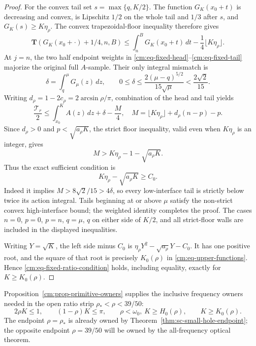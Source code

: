 \documentclass[11pt]{article}
\numberwithin{equation}{section}
\theoremstyle{definition}
\theoremstyle{remark}
\begin{document}
\begin{proof}
For the convex tail set \(s=\max\{q,K/2\}\).  The function
\(G_K(x_0+t)\) is decreasing and convex, is Lipschitz \(1/2\) on the
whole tail and \(1/3\) after \(s\), and
\(G_K(s)\geq K\eta_\rho\).  The convex trapezoidal-floor inequality
therefore gives
\begin{equation}
 \mathbf T(G_K(x_0+\cdot)+1/4,n,B)
 \leq\int_n^B G_K(x_0+t)\,dt
 -\frac14\lfloor K\eta_\rho\rfloor.
 \label{cm:eq-fixed-tail}
\end{equation}
At \(j=n\), the two half endpoint weights in
\eqref{cm:eq-fixed-head}--\eqref{cm:eq-fixed-tail} majorize the original
full \(A\)-sample.  Their only integral mismatch is
\[
 \delta=\int_q^\mu G_\mu(z)\,dz,
 \qquad 0\leq\delta\leq
 \frac{2(\mu-q)^{5/2}}{15\sqrt\mu}<\frac{2\sqrt2}{15}.
\]
Writing \(d_\rho=1-2c_\rho=2\arcsin\rho/\pi\), combination of the
head and tail yields
\[
 \frac{\mathcal T_r}{2}
 \leq\int_{x_0}^KA(z)\,dz+\delta-\frac M4,
 \quad
 M=\lfloor K\eta_\rho\rfloor+d_\rho(n-p)-p.
\]
Since \(d_\rho>0\) and \(p<\sqrt{a_\rho K}\), the strict floor
inequality, valid even when \(K\eta_\rho\) is an integer, gives
\[
 M>K\eta_\rho-1-\sqrt{a_\rho K}.
\]
Thus the exact sufficient condition is
\begin{equation}
 K\eta_\rho-\sqrt{a_\rho K}\geq C_0.
 \label{cm:eq-fixed-ratio-condition}
\end{equation}
Indeed it implies \(M>8\sqrt2/15>4\delta\), so every low-interface tail
is strictly below twice its action integral.  Tails beginning at or above
\(\mu\) satisfy the non-strict convex high-interface bound; the weighted
identity completes the proof.  The cases \(n=0\), \(p=0\), \(p=n\),
\(q=\mu\), \(q\) on either side of \(K/2\), and all strict-floor walls
are included in the displayed inequalities.

Writing \(Y=\sqrt K\), the left side minus \(C_0\) is
\(\eta_\rho Y^2-\sqrt{a_\rho}Y-C_0\).  It has one positive root, and
the square of that root is precisely \(K_0(\rho)\) in
\eqref{cm:eq-upper-functions}.  Hence \eqref{cm:eq-fixed-ratio-condition}
holds, including equality, exactly for \(K\geq K_0(\rho)\).

\end{proof}

Proposition~\ref{cm:prop-primitive-owners} supplies the inclusive
frequency owners needed in the open ratio strip
\(\rho_*<\rho<39/50\):
\[
 2\rho K\leq1,\qquad (1-\rho)K\leq\pi,\qquad
 \rho<\omega_0,\ K\geq H_0(\rho),\qquad K\geq K_0(\rho).
\]
The endpoint \(\rho=\rho_*\) is already owned by
Theorem~\ref{thm:sc-small-hole-endpoint}; the opposite endpoint
\(\rho=39/50\) will be owned by the all-frequency optical theorem.
\end{document}
